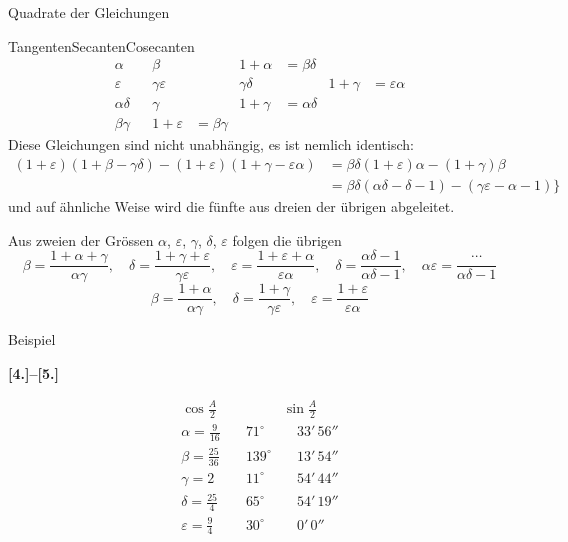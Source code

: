 \documentclass[10pt,a4paper]{article}
\begin{document}
Quadrate der Gleichungen

Tangenten\quad Secanten\quad Cosecanten
%
\begin{align*}
\alpha && \beta && 1 + \alpha &= \beta\delta \\
\varepsilon && \gamma\varepsilon && \gamma\delta && 1 + \gamma &= \varepsilon\alpha \\
\alpha\delta && \gamma && 1 + \gamma &= \alpha\delta \\
\beta\gamma && 1 + \varepsilon &= \beta\gamma
\end{align*}
%
Diese Gleichungen sind nicht unabh\"angig, es ist nemlich identisch:
%
\begin{align*}
(1 + \varepsilon)(1 + \beta - \gamma\delta) - (1 + \varepsilon)(1 + \gamma - \varepsilon\alpha)
&= \beta\delta(1 + \varepsilon)\alpha - (1 + \gamma)\beta \\
&= \beta\delta(\alpha\delta - \delta - 1) - (\gamma\varepsilon - \alpha - 1)\}
\end{align*}
%
und auf \"ahnliche Weise wird die f\"unfte aus dreien der \"ubrigen abgeleitet.

Aus zweien der Gr\"ossen $\alpha$, $\varepsilon$, $\gamma$, $\delta$, $\varepsilon$ folgen die \"ubrigen
%
\begin{equation*}
\beta = \frac{1 + \alpha + \gamma}{\alpha\gamma}, \quad
\delta = \frac{1 + \gamma + \varepsilon}{\gamma\varepsilon}, \quad
\varepsilon = \frac{1 + \varepsilon + \alpha}{\varepsilon\alpha}, \quad
\delta = \frac{\alpha\delta - 1}{\alpha\delta - 1}, \quad
\alpha\varepsilon = \frac{\cdots}{\alpha\delta - 1}
\end{equation*}
%
\begin{equation*}
\beta = \frac{1 + \alpha}{\alpha\gamma}, \quad
\delta = \frac{1 + \gamma}{\gamma\varepsilon}, \quad
\varepsilon = \frac{1 + \varepsilon}{\varepsilon\alpha}
\end{equation*}

Beispiel

\newpage
\textbf{[4.]--[5.]}

\begin{align*}
\cos \tfrac{A}{2} && \sin \tfrac{A}{2} \\
\alpha = \tfrac{9}{16} &\quad 71^{\circ} &\quad 33'\, 56'' \\
\beta = \tfrac{25}{36} &\quad 139^{\circ} &\quad 13'\, 54'' \\
\gamma = 2 &\quad 11^{\circ} &\quad 54'\, 44'' \\
\delta = \tfrac{25}{4} &\quad 65^{\circ} &\quad 54'\, 19'' \\
\varepsilon = \tfrac{9}{4} &\quad 30^{\circ} &\quad 0'\, 0''
\end{align*}
\end{document}
